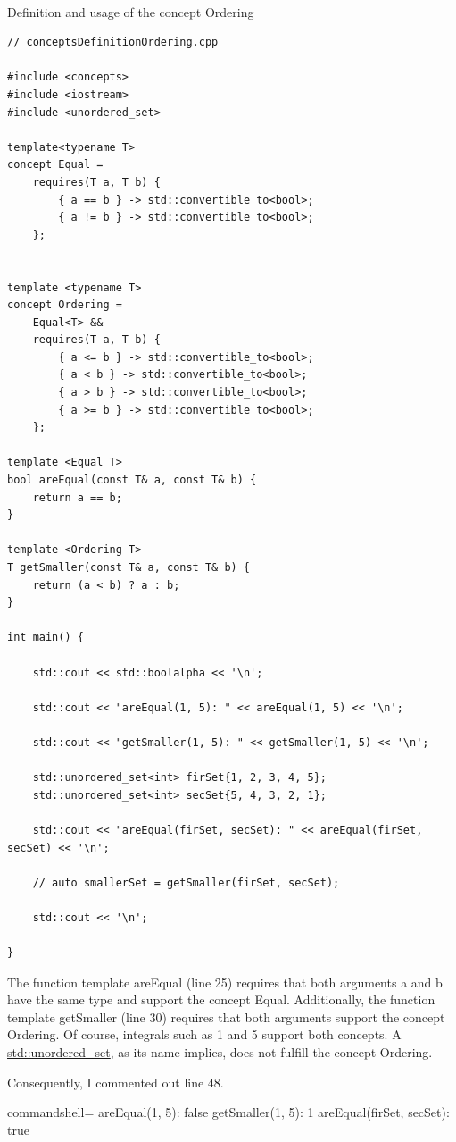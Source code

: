 \hspace*{\fill} \\ %
\noindent
Definition and usage of the concept Ordering
\begin{lstlisting}[style=styleCXX]
// conceptsDefinitionOrdering.cpp

#include <concepts>
#include <iostream>
#include <unordered_set>

template<typename T>
concept Equal =
	requires(T a, T b) {
		{ a == b } -> std::convertible_to<bool>;
		{ a != b } -> std::convertible_to<bool>;
	};


template <typename T>
concept Ordering =
	Equal<T> &&
	requires(T a, T b) {
		{ a <= b } -> std::convertible_to<bool>;
		{ a < b } -> std::convertible_to<bool>;
		{ a > b } -> std::convertible_to<bool>;
		{ a >= b } -> std::convertible_to<bool>;
	};

template <Equal T>
bool areEqual(const T& a, const T& b) {
	return a == b;
}

template <Ordering T>
T getSmaller(const T& a, const T& b) {
	return (a < b) ? a : b;
}

int main() {

	std::cout << std::boolalpha << '\n';
	
	std::cout << "areEqual(1, 5): " << areEqual(1, 5) << '\n';
	
	std::cout << "getSmaller(1, 5): " << getSmaller(1, 5) << '\n';
	
	std::unordered_set<int> firSet{1, 2, 3, 4, 5};
	std::unordered_set<int> secSet{5, 4, 3, 2, 1};
	
	std::cout << "areEqual(firSet, secSet): " << areEqual(firSet, secSet) << '\n';
	
	// auto smallerSet = getSmaller(firSet, secSet);
	
	std::cout << '\n';

}
\end{lstlisting}

The function template areEqual (line 25) requires that both arguments a and b have the same type and support the concept Equal. Additionally, the function template getSmaller (line 30) requires that both arguments support the concept Ordering. Of course, integrals such as 1 and 5 support both concepts. A \href{https://en.cppreference.com/w/cpp/container/unordered_set}{std::unordered\_set}, as its name implies, does not fulfill the concept Ordering.

Consequently, I commented out line 48.

\begin{tcblisting}{commandshell={}}
areEqual(1, 5): false
getSmaller(1, 5): 1
areEqual(firSet, secSet): true
\end{tcblisting}

